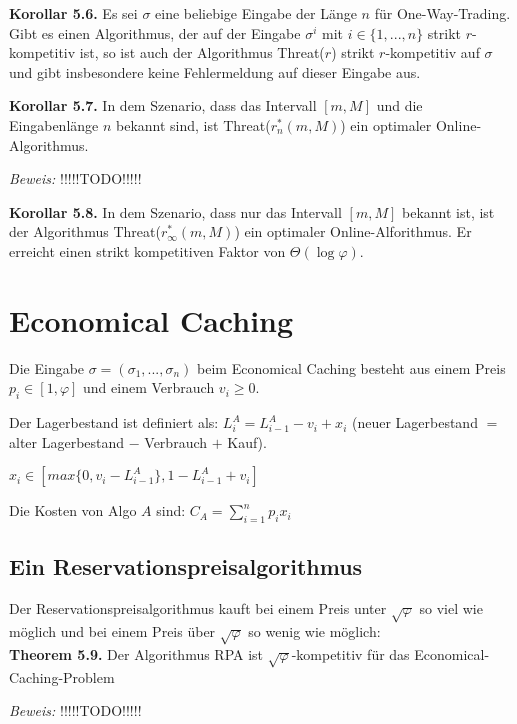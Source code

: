 \textbf{Korollar 5.6.} Es sei $\sigma$ eine beliebige Eingabe der Länge $n$ für One-Way-Trading. Gibt es einen Algorithmus, der auf der Eingabe $\sigma^{i}$ mit $i \in \{1, ..., n\}$ strikt $r$-kompetitiv ist, so ist auch der Algorithmus Threat($r$) strikt $r$-kompetitiv auf $\sigma$ und gibt insbesondere keine Fehlermeldung auf dieser Eingabe aus.

\textbf{Korollar 5.7.} In dem Szenario, dass das Intervall $[m, M]$ und die Eingabenlänge $n$ bekannt sind, ist Threat($r_{n}^{*}(m, M)$) ein optimaler Online-Algorithmus.

\textit{Beweis:} !!!!!TODO!!!!!

\textbf{Korollar 5.8.} In dem Szenario, dass nur das Intervall $[m, M]$ bekannt ist, ist der Algorithmus Threat($r_{\infty}^{*}(m, M)$) ein optimaler Online-Alforithmus. Er erreicht einen strikt kompetitiven Faktor von $\Theta(\log \varphi)$.

\section{Economical Caching}

Die Eingabe $\sigma = (\sigma_{1}, ..., \sigma_{n})$ beim Economical Caching besteht aus einem Preis $p_{i} \in [1, \varphi]$ und einem Verbrauch $v_{i} \ge 0$.

Der Lagerbestand ist definiert als: $L_{i}^{A} = L_{i-1}^{A} - v_{i} + x_{i}$ (neuer Lagerbestand $=$ alter Lagerbestand $-$ Verbrauch $+$ Kauf).

$x_{i} \in [max\{0, v_{i}-L_{i-1}^{A}\}, 1-L_{i-1}^{A}+v_{i}]$

Die Kosten von Algo $A$ sind: $C_{A} = \sum_{i = 1}^{n} p_{i}x_{i}$

\subsection{Ein Reservationspreisalgorithmus}

Der Reservationspreisalgorithmus kauft bei einem Preis unter $\sqrt{\varphi}$ so viel wie möglich und bei einem Preis über $\sqrt{\varphi}$ so wenig wie möglich: \\


\textbf{Theorem 5.9.} Der Algorithmus RPA ist $\sqrt{\varphi}$-kompetitiv für das Economical-Caching-Problem

\textit{Beweis:} !!!!!TODO!!!!!

